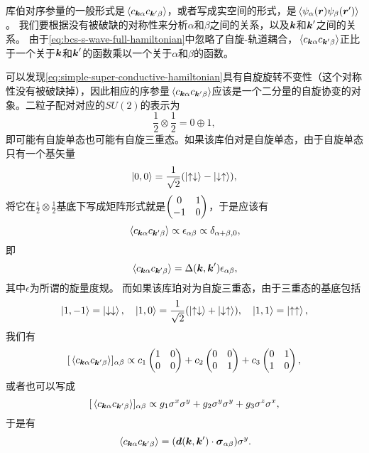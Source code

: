 库伯对序参量的一般形式是$\expval*{{c}_{\vb*{k}\alpha} {c}_{\vb*{k}' \beta}}$，或者写成实空间的形式，是$\expval*{\psi_\alpha(\vb*{r}) \psi_\beta(\vb*{r}')}$。
我们要根据没有被破缺的对称性来分析$\alpha$和$\beta$之间的关系，以及$\vb*{k}$和$\vb*{k}'$之间的关系。
由于\eqref{eq:bcs-s-wave-full-hamiltonian}中忽略了自旋-轨道耦合，$\expval*{{c}_{\vb*{k}\alpha} {c}_{\vb*{k}' \beta}}$正比于一个关于$\vb*{k}$和$\vb*{k}'$的函数乘以一个关于$\alpha$和$\beta$的函数。

可以发现\eqref{eq:simple-super-conductive-hamiltonian}具有自旋旋转不变性（这个对称性没有被破缺掉），因此相应的序参量$\expval*{{c}_{\vb*{k} \alpha} {c}_{\vb*{k}' \beta}}$应该是一个二分量的自旋协变的对象。二粒子配对对应的$SU(2)$的表示为
\[
    \frac{1}{2} \otimes \frac{1}{2} = 0 \oplus 1,
\]
即可能有自旋单态也可能有自旋三重态。如果该库伯对是自旋单态，由于自旋单态只有一个基矢量
\[
    \ket{0, 0} = \frac{1}{\sqrt{2}} (\ket{\uparrow \downarrow} - \ket{\downarrow \uparrow}),
\]
将它在$\frac{1}{2} \otimes \frac{1}{2}$基底下写成矩阵形式就是$\pmqty{0 & 1 \\ -1 & 0}$，于是应该有
\[
    \expval*{{c}_{\vb*{k} \alpha} {c}_{ \vb*{k}' \beta}} \propto \epsilon_{\alpha \beta} \propto \delta_{\alpha+\beta,0},
\]
即
\begin{equation}
    \expval*{{c}_{\vb*{k} \alpha} {c}_{ \vb*{k}' \beta}} = \Delta(\vb*{k}, \vb*{k}') \epsilon_{\alpha \beta}, 
\end{equation}
其中$\epsilon$为所谓的旋量度规。
而如果该库珀对为自旋三重态，由于三重态的基底包括
\[
    \ket{1, -1} = \ket{\downarrow \downarrow}, \quad \ket{1, 0} = \frac{1}{\sqrt{2}} (\ket{\uparrow \downarrow} + \ket{\downarrow \uparrow}), \quad \ket{1, 1} = \ket{\uparrow \uparrow},
\]
我们有
\[
    [\expval*{{c}_{\vb*{k} \alpha} {c}_{ \vb*{k}' \beta}}]_{\alpha \beta} \propto c_1 \pmqty{1 & 0 \\ 0 & 0} + c_2 \pmqty{0 & 0 \\ 0 & 1} + c_3 \pmqty{0 & 1 \\ 1 & 0} ,
\]
或者也可以写成
\[
    [\expval*{{c}_{\vb*{k} \alpha} {c}_{ \vb*{k}' \beta}}]_{\alpha \beta} \propto g_1 \sigma^x \sigma^y + g_2 \sigma^y \sigma^y + g_3 \sigma^z \sigma^x,
\]
于是有
\begin{equation}
    \expval*{{c}_{\vb*{k} \alpha} {c}_{ \vb*{k}' \beta}} = (\vb*{d}(\vb*{k}, \vb*{k}') \cdot \vb*{\sigma}_{\alpha \beta}) \sigma^y.
\end{equation}


